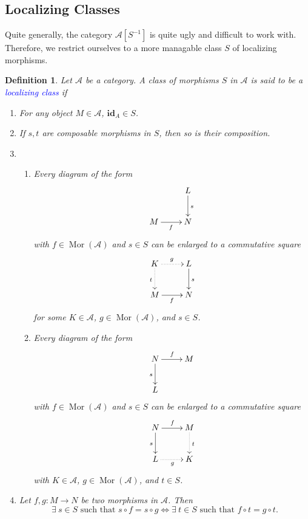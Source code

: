 \documentclass[11pt]{article}
\theoremstyle{thmstyle}
\theoremstyle{defstyle}
\newtheorem{definition}[theorem]{Definition}
\newcommand{\id}{\mathbf{id}}
\newcommand{\scrA}{\mathscr{A}}
\newcommand{\define}[1]{\textcolor{blue}{\textit{#1}}}
\newcommand{\Mor}{\operatorname{Mor}}
\begin{document}
\subsection{Localizing Classes}

Quite generally, the category $\scrA[S^{-1}]$ is quite ugly and difficult to work with. Therefore, we restrict ourselves to a more managable class $S$ of localizing morphisms.

\begin{definition}
	Let $\scrA$ be a category. A class of morphisms $S$ in $\scrA$ is said to be a \define{localizing class} if 
	\begin{enumerate}[label=(\textbf{LC}\arabic*)]
		\item For any object $M\in\scrA$, $\id_A\in S$.\label{lc1}
		\item If $s, t$ are composable morphisms in $S$, then so is their composition.\label{lc2}
		\item 
		\begin{enumerate}
			\item Every diagram of the form 
			\begin{equation*}
				\xymatrix {
					& L\ar[d]^s\\
					M\ar[r]_f & N
				}
			\end{equation*}
			with $f\in\Mor(\scrA)$ and $s\in S$ can be enlarged to a commutative square 
			\begin{equation*}
				\xymatrix {
					K\ar@{.>}[r]^g\ar@{.>}[d]_t & L\ar[d]^s\\
					M\ar[r]_f & N
				}
			\end{equation*}
			for some $K\in\scrA$, $g\in\Mor(\scrA)$, and $s\in S$. \label{pullback-type}
			\item Every diagram of the form 
			\begin{equation*}
				\xymatrix {
					N\ar[r]^f\ar[d]_s & M\\
					L
				}
			\end{equation*}
			with $f\in\Mor(\scrA)$ and $s\in S$ can be enlarged to a commutative square 
			\begin{equation*}
				\xymatrix {
					N\ar[r]^f\ar[d]_s & M\ar@{.>}[d]^t\\
					L\ar@{.>}[r]_g & K
				}
			\end{equation*}
			with $K\in\scrA$, $g\in\Mor(\scrA)$, and $t\in S$.\label{pushout-type}
		\end{enumerate}
		\item Let $f,g\colon M\to N$ be two morphisms in $\scrA$. Then \label{annihilation-condition}
		\begin{equation*}
			\exists~s\in S\text{ such that }s\circ f = s\circ g\iff \exists~t\in S\text{ such that }f\circ t = g\circ t.
		\end{equation*}
	\end{enumerate}
\end{definition}
\end{document}
